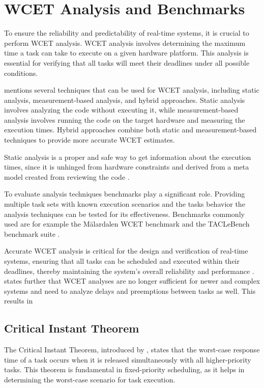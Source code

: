 \section{WCET Analysis and Benchmarks}
\label{sec:wcet_analysis_and_benchmarks}
To ensure the reliability and predictability of real-time systems, it is crucial to perform \ac{WCET} analysis. 
WCET analysis involves determining the maximum time a task can take to execute on a given hardware platform. 
This analysis is essential for verifying that all tasks will meet their deadlines under all possible conditions.

\textcite{kelterWCETAnalysisOptimization} mentions several techniques that can be used for \ac{WCET} analysis, including static analysis, measurement-based analysis, and hybrid approaches.
Static analysis involves analyzing the code without executing it, while measurement-based analysis involves running the code on the target hardware and measuring the execution times. 
Hybrid approaches combine both static and measurement-based techniques to provide more accurate \ac{WCET} estimates.

Static analysis is a proper and safe way to get information about the execution times, since it is unhinged from hardware constraints and derived from a meta model created from reviewing the code \cite{kelterWCETAnalysisOptimization}.

To evaluate analysis techniques benchmarks play a significant role.
Providing multiple task sets with known execution scenarios and the tasks behavior the analysis techniques can be tested for its effectiveness. 
Benchmarks commonly used are for example the Mälardalen \ac{WCET} benchmark and the TACLeBench benchmark suite \cite{falkTACLeBenchBenchmarkCollection2016}.

Accurate \ac{WCET} analysis is critical for the design and verification of real-time systems, ensuring that all tasks can be scheduled and executed within their deadlines, thereby maintaining the system's overall reliability and performance \cite{kelterWCETAnalysisOptimization}.
\textcite{kelterWCETAnalysisOptimization} states further that \ac{WCET} analyses are no longer sufficient for newer and complex systems and need to analyze delays and preemptions between tasks as well.
This results in 
 

\subsection{Critical Instant Theorem}
\label{sec:critial_instant_theorem}
The Critical Instant Theorem, introduced by \textcite{liuSchedulingAlgorithmsMultiprogramming1973}, states that the worst-case response time of a task occurs when it is released simultaneously with all higher-priority tasks. 
This theorem is fundamental in fixed-priority scheduling, as it helps in determining the worst-case scenario for task execution.

